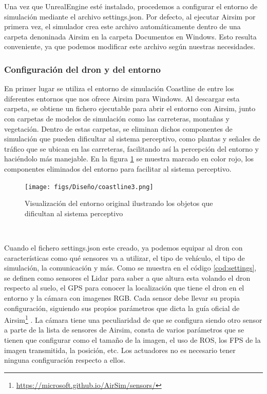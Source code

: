 Una vez que UnrealEngine esté instalado, procedemos a configurar el entorno de simulación mediante el archivo settings.json. Por defecto, al ejecutar Airsim 
por primera vez, el simulador crea este archivo automáticamente dentro de una carpeta denoninada Airsim en la carpeta Documentos en Windows. Esto 
resulta conveniente, ya que podemos modificar este archivo según nuestras necesidades. 


\subsubsection{Configuración del dron y del entorno}
\label{subsec:Configuración del dron y del entorno}

En primer lugar se utiliza el entorno de simulación Coastline de entre los diferentes entornos que nos ofrece Airsim para Windows. Al descargar esta carpeta, 
se obtiene un fichero ejecutable para abrir el entorno con Airsim, junto con carpetas de modelos de simulación como las carreteras, montañas y vegetación. Dentro de estas carpetas, se eliminan dichos componentes 
de simulación que pueden dificultar al sistema perceptivo, como plantas y señales de tráfico que se ubican en las carreteras, facilitando así la percepción del entorno 
y haciéndolo más manejable. En la figura \ref{fig:CoastlineModificado} se muestra marcado en color rojo, los componentes eliminados del entorno para facilitar al sistema 
perceptivo.

\begin{figure} [H]
  \begin{center}
    \texttt{[image: figs/Diseño/coastline3.png]}
  \end{center}
  \caption{Visualización del entorno original ilustrando los objetos que dificultan al sistema perceptivo}
  \label{fig:CoastlineModificado}
\end{figure}\

Cuando el fichero settings.json este creado, ya podemos equipar al dron con características como qué sensores va a utilizar, 
el tipo de vehículo, el tipo de simulación, la comunicación y más. Como se muestra en el código \ref{cod:settings}, se definen como sensores el Lidar para saber a que altura
esta volando el dron respecto al suelo, el GPS para conocer la localización que tiene el dron en el entorno y la cámara con imagenes
RGB. Cada sensor debe llevar su propia configuración, siguiendo sus propios parámetros que dicta la guía oficial de Airsim\footnote{\url{https://microsoft.github.io/AirSim/sensors/}}
. La cámara tiene una peculiaridad de que se configura siendo otro sensor a parte de la lista de sensores de Airsim, consta de varios parámetros que se tienen que configurar como 
el tamaño de la imagen, el uso de ROS, los FPS de la imagen transmitida, la posición, etc. 
Los actuadores no es necesario tener ninguna configuración respecto a ellos. 

